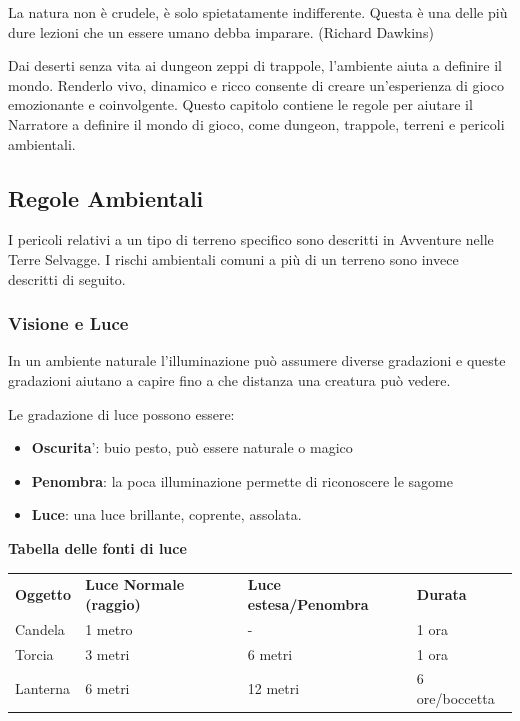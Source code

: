 \documentclass[a4paper,11pt,twoside,openany]{book}
\begin{document}
\label{ambiente}
\begin{tcolorbox}[enhanced,arc=5pt,boxrule=0.3pt]{La natura non è crudele, è solo spietatamente indifferente. Questa è una delle più dure lezioni che un essere umano debba imparare. (Richard Dawkins)}\end{tcolorbox}\medskip

Dai deserti senza vita ai dungeon zeppi di trappole, l'ambiente aiuta a definire il mondo. Renderlo vivo, dinamico e ricco consente di creare un'esperienza di gioco emozionante e coinvolgente. Questo capitolo contiene le regole per aiutare il Narratore a definire il mondo di gioco, come dungeon, trappole, terreni e pericoli ambientali.

\subsection{Regole Ambientali}

\label{regole-ambientali}

I pericoli relativi a un tipo di terreno specifico sono descritti in Avventure nelle Terre Selvagge. I rischi ambientali comuni a più di un terreno sono invece descritti di seguito.

\subsubsection{Visione e Luce}

\label{sec:visione-e-luce}

In un ambiente naturale l'illuminazione può assumere diverse gradazioni e queste gradazioni aiutano a capire fino a che distanza una creatura può vedere.

Le gradazione di luce possono essere:
\begin{itemize}
	\item
	      \textbf{Oscurita}': buio pesto, può essere naturale o magico
	\item
	      \textbf{Penombra}: la poca illuminazione permette di riconoscere le sagome
	\item
	      \textbf{Luce}: una luce brillante, coprente, assolata.
\end{itemize}

\medskip

\textbf{Tabella delle fonti di luce}

\medskip


\begin{tabular}{llll}
	\toprule
	\textbf{Oggetto} & \textbf{Luce Normale (raggio)} & \textbf{Luce estesa/Penombra} & \textbf{Durata}\\
	Candela          & 1 metro         & -              & 1 ora\\
	Torcia           & 3 metri         & 6 metri        & 1 ora\\
	Lanterna         & 6 metri         & 12 metri       & 6 ore/boccetta\\
\end{tabular}
\end{document}
